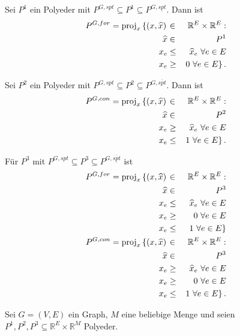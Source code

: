 \documentclass[10p,a4paper,BCOR = 12mm, DIV=15]{scrbook}
\begin{document}
{\begin{Le}
Sei $P^1$ ein Polyeder mit $P^{G, spt} \subseteq P^1 \subseteq P^{G, \underline{spt}}$. Dann ist
\begin{eqnarray*}
P^{G, for} = \operatorname{proj}_x \left\{\left(x, \widehat{x}\right) \right. & \in & \mathbb{R}^E \times \mathbb{R}^E: \nonumber \\
\widehat{x} & \in & P^1 \\
x_e & \leq & \widehat{x}_e\ \forall e \in E \\
x_e & \geq & \left.0\ \forall e \in E\right\}.
\end{eqnarray*}

Sei $P^2$ ein Polyeder mit $P^{G, spt} \subseteq P^2 \subseteq P^{G, \overline{spt}}$. Dann ist
\begin{eqnarray*}
P^{G, con} = \operatorname{proj}_x \left\{\left(x, \widehat{x}\right) \right. & \in & \mathbb{R}^E \times \mathbb{R}^E: \nonumber \\
\widehat{x} & \in & P^2 \\
x_e & \geq & \widehat{x}_e\ \forall e \in E \\
x_e & \leq & \left.1\ \forall e \in E\right\}.
\end{eqnarray*}

Für $P^3$ mit $P^{G, spt} \subseteq P^3 \subseteq P^{G, \overline{\underline{spt}}}$ ist
\begin{eqnarray*}
P^{G, for} = \operatorname{proj}_x \left\{\left(x, \widehat{x}\right) \right. & \in & \mathbb{R}^E \times \mathbb{R}^E: \nonumber \\
\widehat{x} & \in & P^3 \\
x_e & \leq & \widehat{x}_e\ \forall e \in E \\
x_e & \geq & 0\ \forall e \in E \\
x_e & \leq & \left.1\ \forall e \in E\right\} \\
P^{G, con} = \operatorname{proj}_x \left\{\left(x, \widehat{x}\right) \right. & \in & \mathbb{R}^E \times \mathbb{R}^E: \nonumber \\
\widehat{x} & \in & P^3 \\
x_e & \geq & \widehat{x}_e\ \forall e \in E \\
x_e & \geq & 0\ \forall e \in E \\
x_e & \leq & \left.1\ \forall e \in E\right\}.
\end{eqnarray*}
\end{Le}

\begin{Kor}
\label{kor:erw_form_wald_konnektor}
Sei $G=\left(V, E\right)$ ein Graph, $M$ eine beliebige Menge und seien $P^1, P^2, P^3 \subseteq \mathbb{R}^{E} \times \mathbb{R}^M$ Polyeder.


\end{Kor}}
\end{document}
